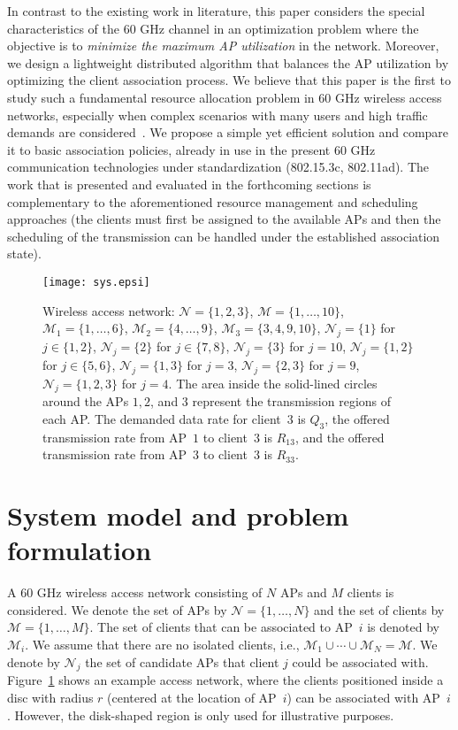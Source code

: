 \documentclass[journal, 10pt, twocolumn]{IEEEtran}
\begin{document}
In contrast to the existing work in literature, this paper considers the special characteristics of the 60 GHz channel in an optimization problem where the objective is to \emph{minimize the maximum AP utilization} in the network. Moreover, we design a lightweight distributed algorithm that balances the AP utilization by optimizing the client association process. We believe that this paper is the first to study such a fundamental resource allocation problem in 60 GHz wireless access networks, especially when complex scenarios with many users and high traffic demands are considered~\cite{Hoydis11, Lee12}. We propose a simple yet efficient solution and compare it to basic association policies, already in use in the present 60 GHz communication technologies under standardization (802.15.3c, 802.11ad). The work that is presented and evaluated in the forthcoming sections is complementary to the aforementioned resource management and scheduling approaches (the clients must first be assigned to the available APs and then the scheduling of the transmission can be handled under the established association state).

\begin{figure}[t]
\centering
\texttt{[image: sys.epsi]}\vspace{-2mm}
\caption{Wireless access network: $\mathcal{N}=\{1,2,3\}$, $\mathcal{M}=\{1,\ldots,10\}$, $\mathcal{M}_1=\{1,\ldots,6\}$, $\mathcal{M}_2=\{4,\ldots,9\}$, $\mathcal{M}_3=\{3,4,9,10\}$, $\mathcal{N}_j=\{1\}$ for $j\in\{1,2\}$, $\mathcal{N}_j=\{2\}$ for $j\in\{7,8\}$, $\mathcal{N}_j=\{3\}$ for $j=10$, $\mathcal{N}_j=\{1,2\}$ for $j\in\{5,6\}$, $\mathcal{N}_j=\{1,3\}$ for $j=3$, $\mathcal{N}_j=\{2,3\}$ for $j=9$, $\mathcal{N}_j=\{1,2,3\}$ for $j=4$. The area inside the solid-lined circles around the APs $1,2$, and $3$ represent the transmission regions of each AP. The demanded data rate for client~$3$ is $Q_3$, the offered transmission rate from AP~$1$ to client~$3$ is $R_{13}$, and the offered transmission rate from AP~$3$ to client~$3$ is $R_{33}$.}
\label{fig:system_example}
\vspace{-4.0mm}
\end{figure}

\section{System model and problem formulation}\label{sec:SysModel_mini_max_primal_problem}

A 60 GHz wireless access network consisting of $N$ APs and $M$ clients is considered. We denote the set of APs by $\mathcal{N}=\{1,\ldots,N\}$ and the set of clients by $\mathcal{M}=\{1,\ldots,M\}$.
The set of clients that can be associated to AP~$i$ is denoted by $\mathcal{M}_i$. We assume that there are no isolated clients, i.e., $\mathcal{M}_1\cup\cdots\cup\mathcal{M}_N=\mathcal{M}$. We denote by $\mathcal{N}_j$ the set of candidate APs that client $j$ could be associated with. Figure~\ref{fig:system_example} shows an example access network, where the clients positioned inside a disc with radius $r$ (centered at the location of AP~$i$) can be associated with AP~$i$. However, the disk-shaped region is only used for illustrative purposes. 
\end{document}
